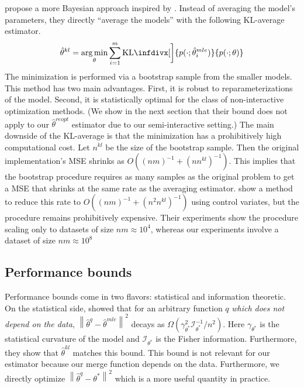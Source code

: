 \documentclass[twoside]{article}
\DeclareMathOperator*{\argmin}{arg\,min}
\newcommand{\w}{\theta}
\newcommand{\wkl}{\hat\w^{kl}}
\newcommand{\wreopt}{\hat\w^{reopt}}
\newcommand{\wave}{\hat\w^{ave}}
\newcommand{\wmle}{\hat\w^{mle}}
\newcommand{\wstar}{{\w^{*}}}
\newcommand{\wq}{\hat\w^{q}}
\newcommand{\I}{\mathcal I}
\newcommand{\ltwo}[1]{{\left\lVert {#1} \right\rVert}}
\newcommand{\kl}{\text{KL}\infdivx}
\begin{document}

\cite{liu2014distributed} propose a more Bayesian approach inspired by \cite{merugu2003privacy}.
Instead of averaging the model's parameters,
they directly ``average the models'' with the following KL-average estimator.
\begin{equation}
\wkl = \argmin_\w \sum_{i=1}^m \kl[\bigg]{p(\cdot;\wmle_i)}{p(\cdot;\w)}
\end{equation}
The minimization is performed via a bootstrap sample from the smaller models.
This method has two main advantages.
First, it is robust to reparameterizations of the model.
Second, it is statistically optimal for the class of non-interactive optimization methods.
(We show in the next section that their bound does not apply to our $\wreopt$ estimator due to our semi-interactive setting.)
The main downside of the KL-average is that the minimization has a prohibitively high computational cost.
Let $n^{kl}$ be the size of the bootstrap sample.
Then the original implementation's MSE shrinks as $O((nm)^{-1}+(nn^{kl})^{-1})$.
This implies that the bootstrap procedure requires as many samples as the original problem to get a MSE that shrinks at the same rate as the averaging estimator.
\cite{han2016bootstrap} show a method to reduce this rate to $O((nm)^{-1}+(n^2n^{kl})^{-1})$ using control variates, but the procedure remains prohibitively expensive.
Their experiments show the procedure scaling only to datasets of size $nm\approx10^4$,
whereas our experiments involve a dataset of size $nm\approx10^8$

\subsection{Performance bounds}
\label{sec:bounds}

Performance bounds come in two flavors: statistical and information theoretic.
On the statistical side, \cite{liu2014distributed} showed that for an arbitrary function $q$ \emph{which does not depend on the data},
$\ltwo{\wq-\wmle}^2$ decays as $\Omega(\gamma^2_\wstar \I^{-1}_\wstar/n^2)$.
Here $\gamma_\wstar$ is the statistical curvature of the model and $\I_\wstar$ is the Fisher information.
Furthermore, they show that $\wkl$ matches this bound.
This bound is not relevant for our estimator because our merge function depends on the data.
Furthermore, we directly optimize $\ltwo{\wq-\wstar}^2$ which is a more useful quantity in practice.
\end{document}
